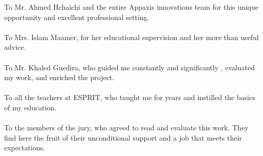 To Mr. Ahmed Hchaichi and the entire Appaxis innovations team for this unique opportunity and excellent professional setting.\\ \\
To Mrs. Islam Maamer, for her educational supervision and her more than useful advice.\\ \\
To Mr. Khaled Guedira, who guided me constantly and significantly , evaluated my work, and enriched the project.\\ \\
To all the teachers at ESPRIT, who taught me for years and instilled the basics of my education.\\ \\
To the members of the jury, who agreed to read and evaluate this work. They find here the fruit of their unconditional support and a job that meets their expectations.